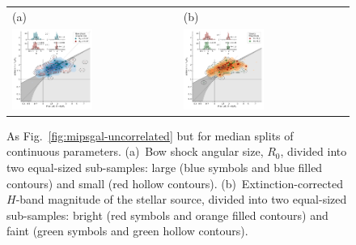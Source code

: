\documentclass[useAMS, usenatbib, a4paper]{mnras}
\begin{document}
\begin{figure}
  \setlength\tabcolsep{0pt}
  \begin{tabular}{ll}
    (a) & (b) \\
    \includegraphics[width=0.5\textwidth]{figs/mipsgal-Rc-R90-R0} &
    \includegraphics[width=0.5\textwidth]{figs/mipsgal-Rc-R90-Mag} 
  \end{tabular}
  \vspace*{-\baselineskip}
  \caption[]{As Fig.~\ref{fig:mipsgal-uncorrelated} but for median
    splits of continuous parameters. (a)~Bow shock angular size,
    \(R_0\), divided into two equal-sized sub-samples: large (blue
    symbols and blue filled contours) and small (red hollow contours).
    (b)~Extinction-corrected \(H\)-band magnitude of the stellar
    source, divided into two equal-sized sub-samples: bright (red
    symbols and orange filled contours) and faint (green symbols and
    green hollow contours).}
  \label{fig:mipsgal-correlated}
\end{figure}
\end{document}

